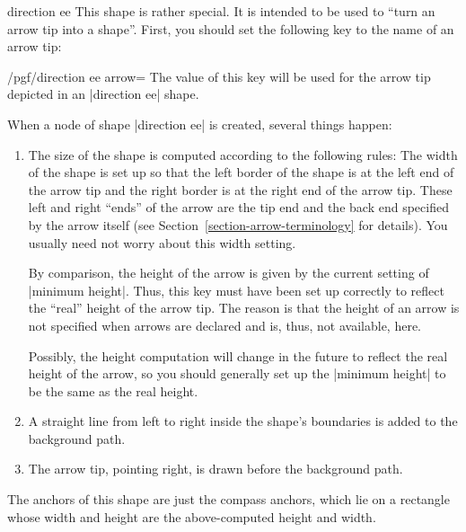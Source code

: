 \begin{shape}{direction ee}
    This shape is rather special. It is intended to be used to ``turn an arrow
    tip into a shape''. First, you should set the following key to the name of
    an arrow tip:
    \begin{key}{/pgf/direction ee arrow=}
        The value of this key will be used for the arrow tip depicted in an
        |direction ee| shape.
    \end{key}
    When a node of shape |direction ee| is created, several things happen:
    \begin{enumerate}
        \item The size of the shape is computed according to the following
            rules: The width of the shape is set up so that the left border of
            the shape is at the left end of the arrow tip and the right border
            is at the right end of the arrow tip. These left and right ``ends''
            of the arrow are the tip end and the back end specified by the
            arrow itself (see Section~\ref{section-arrow-terminology} for
            details). You usually need not worry about this width setting.

            By comparison, the height of the arrow is given by the current
            setting of |minimum height|. Thus, this key must have been set up
            correctly to reflect the ``real'' height of the arrow tip. The
            reason is that the height of an arrow is not specified when arrows
            are declared and is, thus, not available, here.

            Possibly, the height computation will change in the future to
            reflect the real height of the arrow, so you should generally set
            up the |minimum height| to be the same as the real height.
        \item A straight line from left to right inside the shape's boundaries
            is added to the background path.
        \item The arrow tip, pointing right, is drawn before the background
            path.
    \end{enumerate}
    The anchors of this shape are just the compass anchors, which lie on a
    rectangle whose width and height are the above-computed height and width.
\begin{codeexample}[]
\end{codeexample}


\end{shape}
